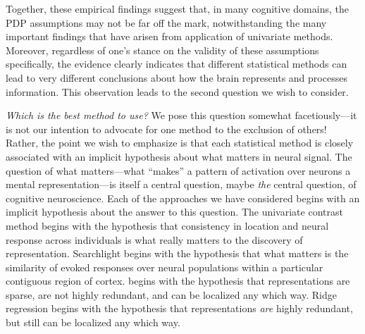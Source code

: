 Together, these empirical findings suggest that, in many cognitive domains, the PDP assumptions may not be far off the mark, notwithstanding the many important findings that have arisen from application of univariate methods. Moreover, regardless of one's stance on the validity of these assumptions specifically, the evidence clearly indicates that different statistical methods can lead to very different conclusions about how the brain represents and processes information. This observation leads to the second question we wish to consider.

{\em Which is the best method to use?} We pose this question somewhat facetiously---it is not our intention to advocate for one method to the exclusion of others! Rather, the point we wish to emphasize is that each statistical method is closely associated with an implicit hypothesis about what matters in neural signal. The question of what matters---what ``makes'' a pattern of activation over neurons a mental representation---is itself a central question, maybe {\em the} central question, of cognitive neuroscience. Each of the approaches we have considered begins with an implicit hypothesis about the answer to this question. The univariate contrast method begins with the hypothesis that consistency in location and neural response across individuals is what really matters to the discovery of representation. Searchlight begins with the hypothesis that what matters is the similarity of evoked responses over neural populations within a particular contiguous region of cortex. {\lasso} begins with the hypothesis that representations are sparse, are not highly redundant, and can be localized any which way. Ridge regression begins with the hypothesis that representations {\em are} highly redundant, but still can be localized any which way.

